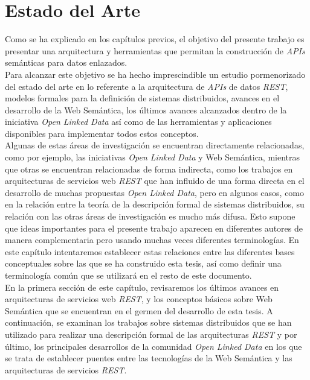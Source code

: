 \chapter{Estado del Arte}

Como se ha explicado en los cap\'itulos previos, el objetivo del presente trabajo es presentar una arquitectura y herramientas que permitan la construcci\'on de \textit{APIs} sem\'anticas para datos enlazados.\\
Para alcanzar este objetivo se ha hecho imprescindible un estudio pormenorizado del estado del arte en lo referente a la arquitectura de \textit{APIs} de datos \textit{REST}, modelos formales para la definici\'on de sistemas distribuidos, avances en el desarrollo de la Web Sem\'antica, los \'ultimos avances alcanzados dentro de la iniciativa \textit{Open Linked Data} as\'i como de las herramientas y aplicaciones disponibles para implementar todos estos conceptos.\\
Algunas de estas \'areas de investigaci\'on se encuentran directamente relacionadas, como por ejemplo, las iniciativas \textit{Open Linked Data} y Web Sem\'antica, mientras que otras se encuentran relacionadas de forma indirecta, como los trabajos en arquitecturas de servicios web \textit{REST} que han influido de una forma directa en el desarrollo de muchas propuestas \textit{Open Linked Data}, pero en algunos casos, como en la relaci\'on entre la teor\'ia de la descripci\'on formal de sistemas distribuidos, su relaci\'on con las otras \'areas de investigaci\'on es mucho m\'as difusa. Esto supone que ideas importantes para el presente trabajo aparecen en diferentes autores de manera complementaria pero usando muchas veces diferentes terminolog\'ias. En este cap\'itulo intentaremos establecer estas relaciones entre las diferentes bases conceptuales sobre las que se ha construido esta tesis, as\'i como definir una terminolog\'ia com\'un que se utilizar\'a en el resto de este documento.\\
En la primera secci\'on de este cap\'itulo, revisaremos los \'ultimos avances en arquitecturas de servicios web \textit{REST}, y los conceptos b\'asicos sobre Web Sem\'antica que se encuentran en el germen del desarrollo de esta tesis. A continuaci\'on, se examinan los trabajos sobre sistemas distribuidos que se han utilizado para realizar una descripci\'on formal de las arquitecturas \textit{REST} y por \'ultimo, los principales desarrollos de la comunidad \textit{Open Linked Data} en los que se trata de establecer puentes entre las tecnolog\'ias de la Web Sem\'antica y las arquitecturas de servicios \textit{REST}.\\


